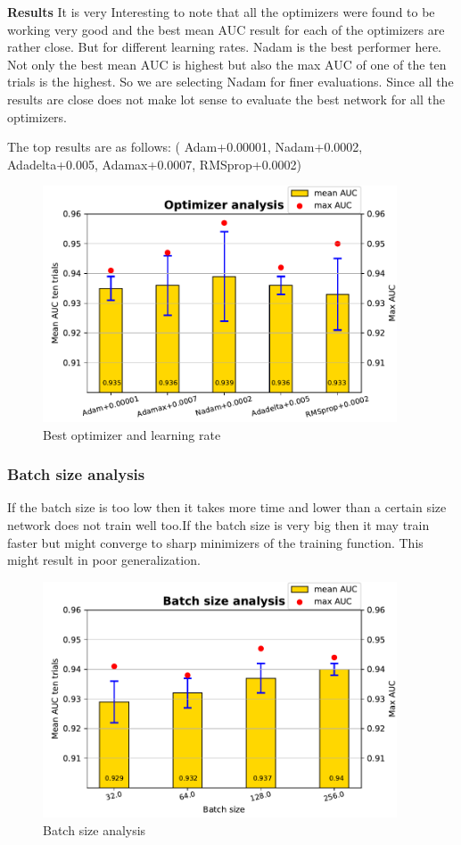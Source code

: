 \textbf{Results}
It is very Interesting to note that all the optimizers were found to be working very good and the best mean AUC result for each of the optimizers are rather close. But for different learning rates. Nadam is the best performer here.
Not only the best mean AUC is highest but also the max AUC of one of the ten trials is the highest. So we are selecting Nadam for finer evaluations. Since all the results are close does not make lot sense to evaluate 
the best network for all the optimizers. 

The top results are as follows:
( Adam+0.00001, Nadam+0.0002, Adadelta+0.005, Adamax+0.0007, RMSprop+0.0002) 

\begin{figure}[ht]
\centering
\includegraphics[height= 7cm]{images/contrastive/contrastive_loss_optimizer_bar}
\caption{Best optimizer and learning rate}
\label{fig:contrastive_loss_optimizer_bar}
\end{figure}

\subsubsection{Batch size analysis}
If the batch size is too low then it takes more time and lower than a certain size network does not train well too.If the batch size is very big then it may train faster but might converge 
to sharp minimizers of the training function. This might result in poor generalization.

\begin{figure}[ht]
\centering
\includegraphics[height= 7cm]{images/contrastive/contrastive_loss_batchsize_bar}
\caption{Batch size analysis}
\label{fig:contrastive_loss_batchsize_bar}
\end{figure}

